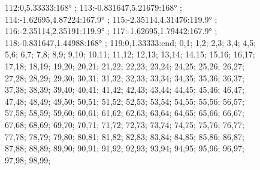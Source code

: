 \documentclass[a4paper,10pt,ngerman]{scrartcl}
\begin{document}
\begin{algorithm}[H]
\begin{figure}[!h]
{                112:0,5.33333:168° ;
                113:-0.831647,5.21679:168° ;
                114:-1.62695,4.87224:167.9° ;
                115:-2.35114,4.31476:119.9° ;
                116:-2.35114,2.35191:119.9° ;
                117:-1.62695,1.79442:167.9° ;
                118:-0.831647,1.44988:168° ;
                119:0,1.33333:end;
            }{
                0,1;
                1,2;
                2,3;
                3,4;
                4,5;
                5,6;
                6,7;
                7,8;
                8,9;
                9,10;
                10,11;
                11,12;
                12,13;
                13,14;
                14,15;
                15,16;
                16,17;
                17,18;
                18,19;
                19,20;
                20,21;
                21,22;
                22,23;
                23,24;
                24,25;
                25,26;
                26,27;
                27,28;
                28,29;
                29,30;
                30,31;
                31,32;
                32,33;
                33,34;
                34,35;
                35,36;
                36,37;
                37,38;
                38,39;
                39,40;
                40,41;
                41,42;
                42,43;
                43,44;
                44,45;
                45,46;
                46,47;
                47,48;
                48,49;
                49,50;
                50,51;
                51,52;
                52,53;
                53,54;
                54,55;
                55,56;
                56,57;
                57,58;
                58,59;
                59,60;
                60,61;
                61,62;
                62,63;
                63,64;
                64,65;
                65,66;
                66,67;
                67,68;
                68,69;
                69,70;
                70,71;
                71,72;
                72,73;
                73,74;
                74,75;
                75,76;
                76,77;
                77,78;
                78,79;
                79,80;
                80,81;
                81,82;
                82,83;
                83,84;
                84,85;
                85,86;
                86,87;
                87,88;
                88,89;
                89,90;
                90,91;
                91,92;
                92,93;
                93,94;
                94,95;
                95,96;
                96,97;
                97,98;
                98,99;
}
\end{figure}
\end{algorithm}
\end{document}
